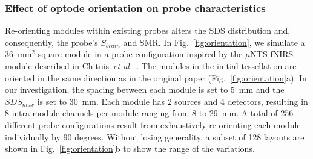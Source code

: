 \subsubsection{Effect of optode orientation on probe characteristics}
Re-orienting modules within existing probes alters the \ac{SDS} distribution and, consequently, the probe's $S_{brain}$ and \ac{SMR}. In Fig.~\ref{fig:orientation}, we simulate a 36~$\textrm{mm}^2$ square module in a probe configuration inspired by the $\mu$NTS \ac{fNIRS} module described in Chitnis~\emph{et al.}~\cite{Chitnis2016}. The modules in the initial tessellation are oriented in the same direction as in the original paper (Fig.~\ref{fig:orientation}a). In our investigation, the spacing between each module is set to 5~mm and the $SDS_{max}$ is set to 30~mm. Each module has 2 sources and 4 detectors, resulting in 8 intra-module channels per module ranging from 8 to 29~mm. A total of 256 different probe configurations result from exhaustively re-orienting each module individually by 90 degrees. Without losing generality, a subset of 128 layouts are shown in Fig.~\ref{fig:orientation}b to show the range of the variations.

